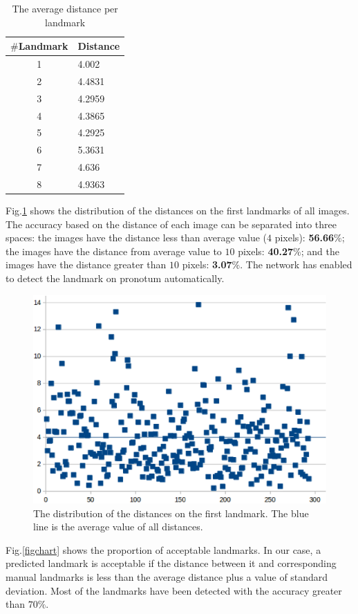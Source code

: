 \documentclass[conference]{IEEEtran}
\begin{document}
\begin{table}[htbp]
\caption{The average distance per landmark}
\begin{center}
\begin{tabular}{|c|p{1.5cm}|}
\hline
\textbf{$\#$Landmark} & \textbf{Distance} \\ \hline
1 & 4.002  \\ \hline
2 & 4.4831 \\ \hline
3 & 4.2959 \\ \hline
4 & 4.3865 \\ \hline
5 & 4.2925 \\ \hline
6 & 5.3631 \\ \hline
7 & 4.636 \\ \hline
8 & 4.9363 \\ \hline
\end{tabular}
\label{tab2}
\end{center}
\end{table}

Fig.\ref{figchartlm1} shows the distribution of the distances on the first landmarks of all images. The accuracy based on the distance of each image can be separated into three spaces: the images have the distance less than average value ($4$ pixels): \textbf{56.66$\%$}; the images have the distance from average value to $10$ pixels: \textbf{40.27$\%$}; and the images have the distance greater than $10$ pixels: \textbf{3.07$\%$}. The network has enabled to detect the landmark on pronotum automatically. %

\begin{figure}[htbp]
	\centerline{\includegraphics[scale=0.3]{images/statistic.eps}}
	\caption{The distribution of the distances on the first landmark. The blue line is the average value of all distances.}
	\label{figchartlm1}
\end{figure}
Fig.\ref{figchart} shows the proportion of acceptable landmarks. In our case, a predicted landmark is acceptable if the distance between it and corresponding manual landmarks is less than the average distance plus a value of standard deviation. Most of the landmarks have been detected with the accuracy greater than $70\%$. %
\end{document}
